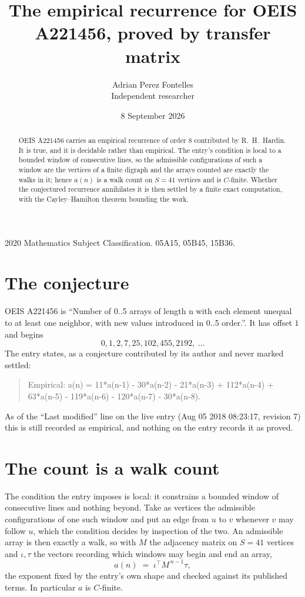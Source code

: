 \documentclass[11pt,a4paper]{article}
\title{The empirical recurrence for OEIS A221456, proved by transfer matrix}
\author{Adrian Perez Fontelles\\ \small Independent researcher}
\date{8 September 2026}
\theoremstyle{plain}
\theoremstyle{definition}
\begin{document}
\maketitle

\begin{abstract}
OEIS A221456 carries an empirical recurrence of order $8$ contributed by R.~H.~Hardin. It is
true, and it is decidable rather than empirical. The entry's condition is local to a bounded window of consecutive lines, so
the admissible configurations of such a window are the vertices of a finite digraph and the
arrays counted are exactly the walks in it; hence $a(n)$ is a walk count on $S=41$ vertices
and is $C$-finite. Whether the conjectured recurrence annihilates it is then settled by a
finite exact computation, with the Cayley--Hamilton theorem bounding the work.
\end{abstract}

\noindent\small 2020 Mathematics Subject Classification. 05A15, 05B45, 15B36.\normalsize

\section{The conjecture}

OEIS A221456 is ``Number of 0..5 arrays of length n with each element unequal to at least one neighbor, with new values introduced in 0..5 order.''. It has offset $1$ and begins
\[
0, 1, 2, 7, 25, 102, 455, 2192,\ \dots
\]
The entry states, as a conjecture contributed by its author and never marked settled:
\begin{quote}
Empirical: a(n) = 11*a(n-1) - 30*a(n-2) - 21*a(n-3) + 112*a(n-4) + 63*a(n-5) - 119*a(n-6) - 120*a(n-7) - 30*a(n-8).
\end{quote}
As of the ``Last modified'' line on the live entry (Aug 05 2018 08:23:17, revision 7) this is still
recorded as empirical, and nothing on the entry records it as proved.

\section{The count is a walk count}

The condition the entry imposes is local: it constrains a bounded window of consecutive lines and nothing beyond. Take as
vertices the admissible configurations of one such window and put an edge from $u$ to $v$
whenever $v$ may follow $u$, which the condition decides by inspection of the two. An
admissible array is then exactly a walk, so with $M$ the adjacency matrix on $S=41$ vertices
and $\iota,\tau$ the vectors recording which windows may begin and end an array,
\[
a(n)\;=\;\iota^{\!\top}M^{\,n-1}\tau ,
\]
the exponent fixed by the entry's own shape and checked against its published terms. In
particular $a$ is $C$-finite.
\end{document}
